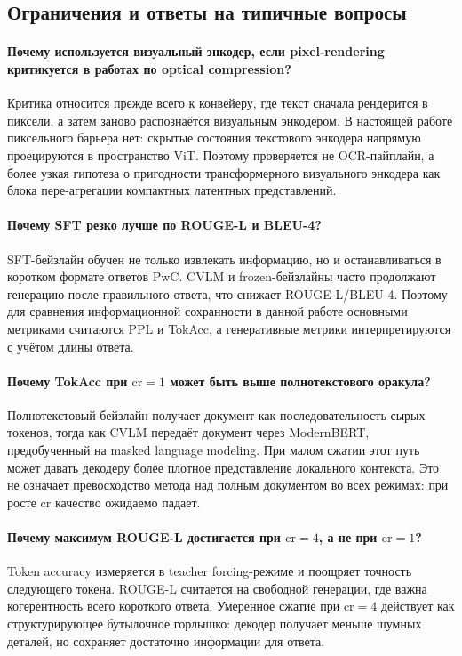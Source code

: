 \documentclass[a4paper,12pt]{extarticle}
\begin{document}
\subsection{Ограничения и ответы на типичные вопросы}\label{sec:limitations-answers}

\paragraph{Почему используется визуальный энкодер, если pixel-rendering критикуется в работах по optical compression?}
Критика относится прежде всего к конвейеру, где текст сначала рендерится в пиксели, а затем заново распознаётся визуальным энкодером. В настоящей работе пиксельного барьера нет: скрытые состояния текстового энкодера напрямую проецируются в пространство ViT. Поэтому проверяется не OCR-пайплайн, а более узкая гипотеза о пригодности трансформерного визуального энкодера как блока пере-агрегации компактных латентных представлений.

\paragraph{Почему SFT резко лучше по ROUGE-L и BLEU-4?}
SFT-бейзлайн обучен не только извлекать информацию, но и останавливаться в коротком формате ответов PwC. CVLM и frozen-бейзлайны часто продолжают генерацию после правильного ответа, что снижает ROUGE-L/BLEU-4. Поэтому для сравнения информационной сохранности в данной работе основными метриками считаются PPL и TokAcc, а генеративные метрики интерпретируются с учётом длины ответа.

\paragraph{Почему TokAcc при $\text{cr}=1$ может быть выше полнотекстового оракула?}
Полнотекстовый бейзлайн получает документ как последовательность сырых токенов, тогда как CVLM передаёт документ через ModernBERT, предобученный на masked language modeling. При малом сжатии этот путь может давать декодеру более плотное представление локального контекста. Это не означает превосходство метода над полным документом во всех режимах: при росте $\text{cr}$ качество ожидаемо падает.

\paragraph{Почему максимум ROUGE-L достигается при $\text{cr}=4$, а не при $\text{cr}=1$?}
Token accuracy измеряется в teacher forcing-режиме и поощряет точность следующего токена. ROUGE-L считается на свободной генерации, где важна когерентность всего короткого ответа. Умеренное сжатие при $\text{cr}=4$ действует как структурирующее бутылочное горлышко: декодер получает меньше шумных деталей, но сохраняет достаточно информации для ответа.
\end{document}
